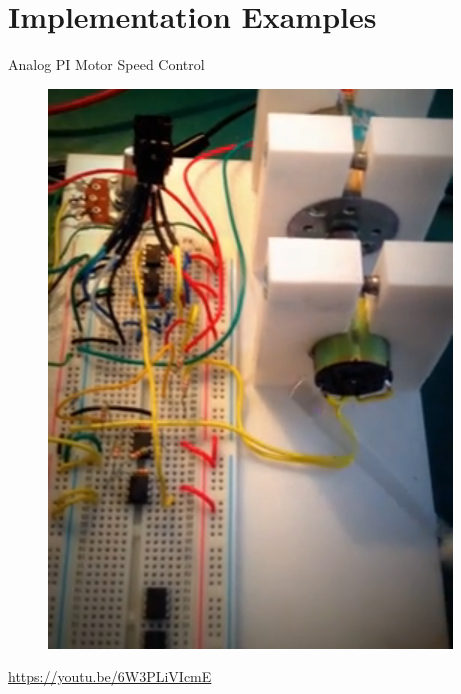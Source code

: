 \section{Implementation Examples}
\begin{frame}{Analog PI Motor Speed Control}
	\begin{figure}
\centering
\includegraphics[width=0.4\linewidth]{img/feedback_motor}
\end{figure}
\url{https://youtu.be/6W3PLiVIcmE}
\end{frame}
